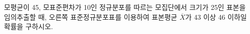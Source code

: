 \noindent\begin{minipage}[t]{0.58\linewidth}\vspace{0pt}\raggedright 모평균이 45, 모표준편차가 10인 정규분포를 따르는 모집단에서 크기가 25인 표본을 임의추출할 때, 오른쪽 표준정규분포표를 이용하여 표본평균 $\overline{X}$가 43 이상 46 이하일 확률을 구하시오.\end{minipage}\hfill\begin{minipage}[t]{0.4\linewidth}\vspace{0pt}\centering \resizebox{\ifdim\width>\linewidth\linewidth\else\width\fi}{!}{}\end{minipage}\par
